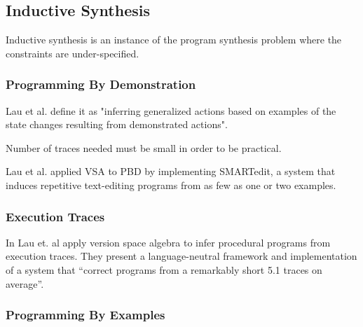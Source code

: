 \subsection{Inductive Synthesis}
\label{sec:inductive}

Inductive synthesis is an instance of the program synthesis problem where the
constraints are under-specified.

\subsubsection{Programming By Demonstration}


Lau et al. define it as "inferring generalized actions based on examples of the
state changes resulting from demonstrated actions".

Number of traces needed must be small in order to be practical.

Lau et al. applied VSA to PBD by implementing SMARTedit, a system that induces
repetitive text-editing programs from as few as one or two examples.

\subsubsection{Execution Traces}


In \cite{Lau:traces:2003} Lau et. al apply version space algebra to infer
procedural programs from execution traces.
They present a language-neutral framework and implementation of a system that
``correct programs from a remarkably short 5.1 traces on average''.

\subsubsection{Programming By Examples}


